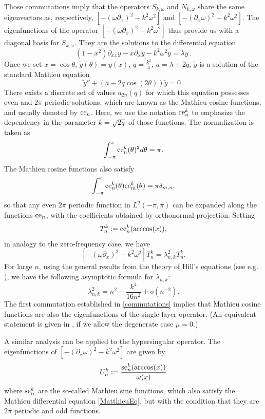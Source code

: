 \documentclass[a4paper]{article}
\begin{document}
Those commutations imply that the operators $S_{k,\omega}$ and $N_{k,\omega}$ share the same eigenvectors as, respectively, 
$\left[-(\omega \partial_x)^2 - k^2\omega^2\right]$ and $ \left[-(\partial_x \omega)^2 - k^2\omega^2\right]$. The eigenfunctions 
of the operator $\left[ -(\omega \partial_x)^2 - k^2\omega^2\right]$ thus provide us with a diagonal basis for $S_{k,\omega}$. 
They are the solutions to the differential equation 
\[ (1-x^2) \partial_{xx}y - x \partial_xy - k^2 \omega^2 y = \lambda y\,.\]
Once we set $x = \cos \theta$, $\tilde{y}(\theta) = y(x)$,  $q = \frac{k^2}{4}$, $a = \lambda + 2q$, $\tilde{y}$ is a solution of the 
standard Mathieu equation 
\begin{equation}
\label{MatthieuEq}
	\tilde{y}'' + (a - 2q \cos(2\theta)) \tilde{y} = 0\,.
\end{equation}
There exists a discrete set of values $a_{2n}(q)$ for which this equation possesses even and $2\pi$ periodic solutions, which are 
known as the Mathieu cosine functions, and usually denoted by $\textup{ce}_n$. Here, we use the notation $\textup{ce}^k_n$ to 
emphasize the dependency in the parameter $k = \sqrt{2q}$ of those functions. The normalization is taken as
\[ \int_{-\pi}^{\pi} \textup{ce}^k_n(\theta)^2 d\theta = \pi.\]
	The Mathieu cosine functions also satisfy
\[ \int_{-\pi}^{\pi}\textup{ce}^k_n(\theta) \textup{ce}^k_m(\theta) = \pi \delta_{m,n}.\]
so that any even $2\pi$ periodic function in $L^2(-\pi,\pi)$ can be expanded along the functions $\textup{ce}_n$, with the coefficients 
obtained by orthonormal projection. Setting 
\[T_{n}^k \mathrel{\mathop:}= \textup{ce}^k_n(\arccos(x)),\]
in analogy to the zero-frequency case, we have
\[\left[-(\omega \partial_x)^2 - k^2\omega^2\right] T_{n}^k = \lambda_{n,k}^2 T_{n}^k.\]
For large $n$, using the general results from the theory of Hill's equations (see e.g. \cite[eq. (21), (28) and (29)]{NIST:DLMF}), 
we have the following 
asymptotic formula for $\lambda_{n,k}$:
\[ \lambda_{n,k}^2 = n^2 - \frac{k^4}{16n^2} +o \left(n^{-2}\right). \]
The first commutation established in \autoref{commutations} implies that Mathieu cosine functions are also the eigenfunctions of the 
single-layer operator. (An equivalent statement is given in \cite[Thm 4.2]{betcke2014spectral}, if we allow the degenerate case $\mu = 0$.) 

A similar analysis can be applied to the hypersingular operator. The eigenfunctions of $\left[-(\partial_x \omega)^2 - k^2 \omega^2\right]$ 
are given by 
\[U_n^k \mathrel{\mathop:}= \frac{\textup{se}_n^k(\arccos(x))}{\omega(x)}\]
where $\textup{se}_n^k$ are the so-called Mathieu sine functions, which also satisfy the Mathieu differential equation \eqref{MatthieuEq}, 
but with the condition that they are $2\pi$ periodic and odd functions. 
\end{document}
